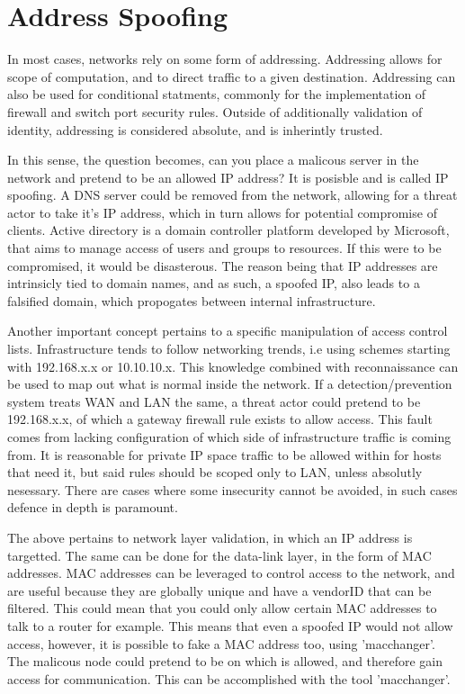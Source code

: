 \section{Address Spoofing}
In most cases, networks rely on some form of addressing. Addressing allows for scope of computation, and to direct traffic to a given destination. 
Addressing can also be used for conditional statments, commonly for the implementation of firewall and switch port security rules. Outside of additionally validation of identity, addressing
is considered absolute, and is inherintly trusted. \citep{IPMACSpoofing}

In this sense, the question becomes, can you place a malicous server in the network and pretend to be an allowed IP address? It is posisble and is called IP spoofing. A DNS server could be removed from the network, allowing for a threat actor to take it's IP address, 
which in turn allows for potential compromise of clients. Active directory is a domain controller platform developed by Microsoft, that aims to manage access of users and groups to resources. If this were to be compromised, it would be disasterous. 
The reason being that IP addresses are intrinsicly tied to domain names, and as such, a spoofed IP, also leads to a falsified domain, which propogates between internal infrastructure. \citep{DNSSpoofing}

Another important concept pertains to a specific manipulation of access control lists. Infrastructure tends to follow networking trends, i.e using schemes starting with 192.168.x.x or 10.10.10.x. This knowledge combined with reconnaissance can be used to map out what is normal inside the network.
If a detection/prevention system treats WAN and LAN the same, a threat actor could pretend to be 192.168.x.x, of which a gateway firewall rule exists to allow access. This fault comes from lacking configuration of which side of infrastructure traffic is coming from. 
It is reasonable for private IP space traffic to be allowed within for hosts that need it, but said rules should be scoped only to LAN, unless absolutly nesessary. There are cases where some insecurity cannot be avoided, in such cases defence in depth is paramount.

The above pertains to network layer validation, in which an IP address is targetted. The same can be done for the data-link layer, in the form of MAC addresses. MAC addresses can be leveraged to control access to the network, and are useful because they are globally unique and have a vendorID that can be filtered.
This could mean that you could only allow certain MAC addresses to talk to a router for example. This means that even a spoofed IP would not allow access, however, it is possible to fake a MAC address too, using 'macchanger'. The malicous node could pretend to be on which is allowed, and therefore gain access for communication. 
This can be accomplished with the tool 'macchanger'. \citep{IPMACSpoofing}

